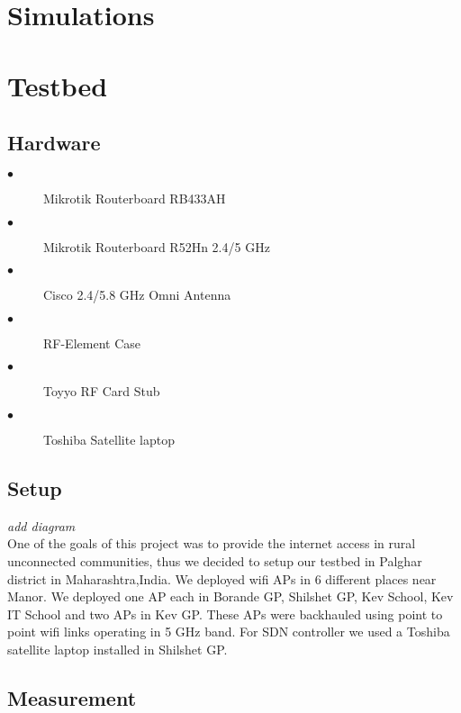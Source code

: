 \documentclass[12pt]{article}
\begin{document}
 \section {Simulations}   
 
 
 \section{Testbed}
   \subsection{Hardware}
       \begin{description}
	   	\item[$\bullet$] Mikrotik Routerboard RB433AH 
	   	\item[$\bullet$] Mikrotik Routerboard R52Hn 2.4/5 GHz
	   	\item[$\bullet$] Cisco 2.4/5.8 GHz Omni Antenna
	   	\item[$\bullet$] RF-Element Case
	   	\item[$\bullet$] Toyyo RF Card Stub
	   	\item[$\bullet$] Toshiba Satellite laptop 
	   	\end{description}
   	 \subsection{Setup}
   	 \textit{add diagram}\\
   	 One of the goals of this project was to provide the internet access in rural unconnected communities, thus we decided to setup our testbed in Palghar district in Maharashtra,India. We deployed wifi APs in 6 different places near Manor. We deployed one AP each in Borande GP, Shilshet GP, Kev School, Kev IT School and two APs in Kev GP. These APs were backhauled using point to point wifi links operating in 5 GHz band. For SDN controller we used a Toshiba satellite laptop installed in Shilshet GP.
   	 \subsection{Measurement}
   	 
   	 
   	   
   
   
    
    
    
  
\end{document}
